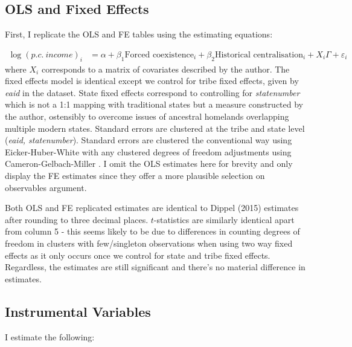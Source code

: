 \documentclass[12pt]{article}
\begin{document}

\subsection{ OLS and Fixed Effects}
First, I replicate the OLS and FE tables using the estimating equations:

\begin{align*}
    \log(p.c. \ income)_i &= \alpha + \beta_1 \text{Forced coexistence}_i   + \beta_2 \text{Historical centralisation}_i + X_i \Gamma  + \varepsilon_i
\end{align*}
 where $X_i$ corresponds to a matrix of covariates described by the author. The 
 fixed effects model is identical except we control for tribe fixed effects, given by \textit{eaid} in the dataset. State fixed 
 effects correspond to controlling for \textit{statenumber} which is not a 1:1 mapping with traditional states but a measure 
 constructed by the author, ostensibly to overcome issues of ancestral homelands overlapping multiple modern states. Standard 
 errors are clustered at the tribe and state level (\textit{eaid, statenumber}). Standard errors are clustered the conventional way using 
 Eicker-Huber-White with any clustered degrees of freedom adjustments using Cameron-Gelbach-Miller \citep{cluster}. I omit the OLS estimates here for brevity
 and only display the FE estimates since they offer a more plausible selection on observables argument. 
% 




% 
% 





Both OLS and FE replicated estimates are identical to Dippel (2015) estimates 
after rounding to three decimal places. $t$-statistics are similarly identical apart 
from column 5 - this seems likely to be due to differences in counting degrees of freedom in clusters
with few/singleton observations when using two way fixed effects as it only occurs once we control for state and tribe fixed effects. 
Regardless, the estimates are still significant and there's no material difference in estimates.

\subsection{Instrumental Variables}
I estimate the following:
\end{document}
